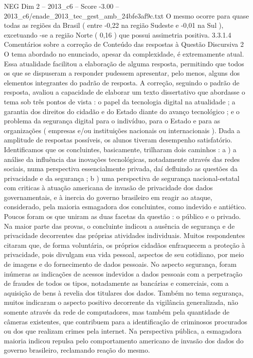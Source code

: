\begin{textsample}{NEG Dim 2 – 2013\_c6 – Score -3.00 – 2013\_c6/enade\_2013\_tec\_gest\_amb\_24bfe3af9c.txt}
O mesmo ocorre para quase todas as regiões da Brasil ( entre -0,22 na região Sudeste e -0,01 na Sul ), excetuando -se a região Norte ( 0,16 ) que possui assimetria positiva. 3.3.1.4 Comentários sobre a correção de Conteúdo das respostas à Questão Discursiva 2 O tema abordado no enunciado, apesar da complexidade, é extremamente atual.
Essa atualidade facilitou a elaboração de alguma resposta, permitindo que todos os que se dispuseram a responder pudessem apresentar, pelo menos, alguns dos elementos integrantes do padrão de resposta.
A correção, seguindo o padrão de resposta, avaliou a capacidade de elaborar um texto dissertativo que abordasse o tema sob três pontos de vista : o papel da tecnologia digital na atualidade ; a garantia dos direitos do cidadão e do Estado diante do avanço tecnológico ; e o problema da segurança digital para o indivíduo, para o Estado e para as organizações ( empresas e/ou instituições nacionais ou internacionais ).
Dada a amplitude de respostas possíveis, os alunos tiveram desempenho satisfatório.
Identificamos que os concluintes, basicamente, trilharam dois caminhos : a ) a análise da influência das inovações tecnológicas, notadamente através das redes sociais, numa perspectiva essencialmente privada, daí defluindo as questões da privacidade e da segurança ; b ) uma perspectiva de segurança nacional-estatal com criticas à atuação americana de invasão de privacidade dos dados governamentais, e à inercia do governo brasileiro em reagir ao ataque, considerado, pela maioria esmagadora dos concluintes, como indevido e antiético.
Poucos foram os que uniram as duas facetas da questão : o público e o privado.
Na maior parte das provas, o concluinte indicou a ausência de segurança e de privacidade decorrentes das próprias atividades individuais.
Muitos respondentes citaram que, de forma voluntária, os próprios cidadãos enfraquecem a proteção à privacidade, pois divulgam sua vida pessoal, aspectos de seu cotidiano, por meio de imagens e do fornecimento de dados pessoais.
No aspecto segurança, foram inúmeras as indicações de acessos indevidos a dados pessoais com a perpetração de fraudes de todos os tipos, notadamente as bancárias e comerciais, com a aquisição de bens à revelia dos titulares dos dados.
Também no tema segurança, muitos indicaram o aspecto positivo decorrente da vigilância generalizada, não somente através da rede de computadores, mas também pela quantidade de câmeras existentes, que contribuem para a identificação de criminosos procurados ou dos que realizam crimes pela internet.
Na perspectiva pública, a esmagadora maioria indicou repulsa pelo comportamento americano de invasão dos dados do governo brasileiro, reclamando reação do mesmo.

\end{textsample}
